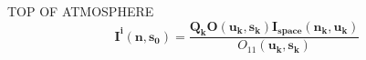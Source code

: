\begin{minipage}{7cm}
\begin{sf}
TOP OF ATMOSPHERE
\[
\mathbf{I^i(n,s_0)}=\frac{\mathbf{Q_k}\mathbf{O(u_k,s_k)I_{space}(n_k,u_k)}}{O_{11}(\mathbf{u_{k},s_k})}
\]
\end{sf}
\end{minipage}
